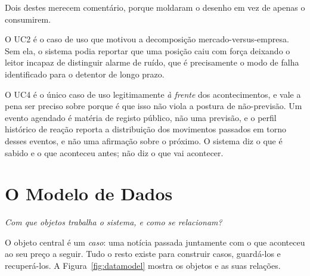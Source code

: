 Dois destes merecem comentário, porque moldaram o desenho em vez de apenas o consumirem.

O UC2 é o caso de uso que motivou a decomposição mercado-versus-empresa. Sem ela, o sistema podia
reportar que uma posição caiu com força deixando o leitor incapaz de distinguir alarme de ruído, que
é precisamente o modo de falha identificado para o detentor de longo prazo.

O UC4 é o único caso de uso legitimamente \emph{à frente} dos acontecimentos, e vale a pena ser
preciso sobre porque é que isso não viola a postura de não-previsão. Um evento agendado é matéria de
registo público, não uma previsão, e o perfil histórico de reação reporta a distribuição dos
movimentos passados em torno desses eventos, e não uma afirmação sobre o próximo. O sistema diz o
que é sabido e o que aconteceu antes; não diz o que vai acontecer.

\section{O Modelo de Dados}
\label{sec:investigator_datamodel}

\emph{Com que objetos trabalha o sistema, e como se relacionam?}

O objeto central é um \emph{caso}: uma notícia passada juntamente com o que aconteceu ao seu preço a seguir.
Tudo o resto existe para construir casos, guardá-los e recuperá-los. A Figura~\ref{fig:datamodel} mostra os
objetos e as suas relações.

